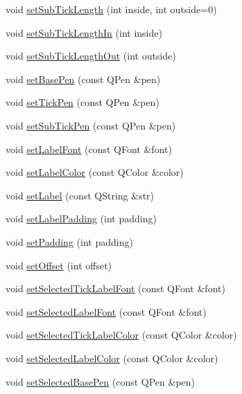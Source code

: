 \begin{DoxyCompactItemize}
\item 
void \hyperlink{classQCPAxis_ab702d6fd42fc620607435339a1c2a2e1}{set\+Sub\+Tick\+Length} (int inside, int outside=0)
\item 
void \hyperlink{classQCPAxis_ac46fa2a993a9f5789540977610acf1de}{set\+Sub\+Tick\+Length\+In} (int inside)
\item 
void \hyperlink{classQCPAxis_a4c6dfc3963492ed72a77724012df5f23}{set\+Sub\+Tick\+Length\+Out} (int outside)
\item 
void \hyperlink{classQCPAxis_a778d45fb71b3c7ab3bb7079e18b058e4}{set\+Base\+Pen} (const Q\+Pen \&pen)
\item 
void \hyperlink{classQCPAxis_ad80923bcc1c5da4c4db602c5325e797e}{set\+Tick\+Pen} (const Q\+Pen \&pen)
\item 
void \hyperlink{classQCPAxis_aede4028ae7516bd51a60618a8233f9cf}{set\+Sub\+Tick\+Pen} (const Q\+Pen \&pen)
\item 
void \hyperlink{classQCPAxis_a71ac1a47f7547e490a8c4311d1433cf3}{set\+Label\+Font} (const Q\+Font \&font)
\item 
void \hyperlink{classQCPAxis_a6c906fe56d75f0122335b9f79b999608}{set\+Label\+Color} (const Q\+Color \&color)
\item 
void \hyperlink{classQCPAxis_a33bcc382c111c9f31bb0687352a2dea4}{set\+Label} (const Q\+String \&str)
\item 
void \hyperlink{classQCPAxis_a4391192a766e5d20cfe5cbc17607a7a2}{set\+Label\+Padding} (int padding)
\item 
void \hyperlink{classQCPAxis_a5691441cb3de9e9844855d339c0db279}{set\+Padding} (int padding)
\item 
void \hyperlink{classQCPAxis_a04a652603cbe50eba9969ee6d68873c3}{set\+Offset} (int offset)
\item 
void \hyperlink{classQCPAxis_a845ccb560b7bc5281098a5be494145f6}{set\+Selected\+Tick\+Label\+Font} (const Q\+Font \&font)
\item 
void \hyperlink{classQCPAxis_a02ec2a75d4d8401eaab834fbc6803d30}{set\+Selected\+Label\+Font} (const Q\+Font \&font)
\item 
void \hyperlink{classQCPAxis_a9bdbf5e63ab15187f3a1de9440129227}{set\+Selected\+Tick\+Label\+Color} (const Q\+Color \&color)
\item 
void \hyperlink{classQCPAxis_a5d502dec597c634f491fdd73d151c72d}{set\+Selected\+Label\+Color} (const Q\+Color \&color)
\item 
void \hyperlink{classQCPAxis_aeb917a909215605b95ef2be843de1ee8}{set\+Selected\+Base\+Pen} (const Q\+Pen \&pen)

\end{DoxyCompactItemize}
